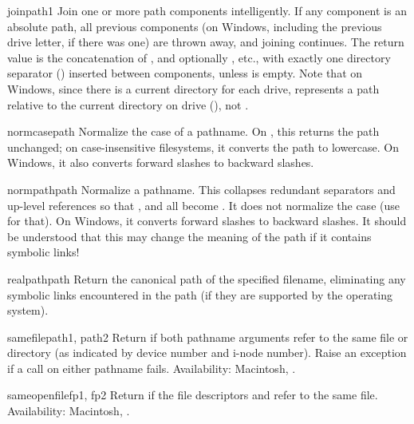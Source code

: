 \begin{funcdesc}{join}{path1}
Join one or more path components intelligently.  If any component is
an absolute path, all previous components (on Windows, including the
previous drive letter, if there was one) are thrown away, and joining
continues.  The return value is the concatenation of , and
optionally , etc., with exactly one directory separator
() inserted between components, unless  is
empty.  Note that on Windows, since there is a current directory for
each drive,  represents a path
relative to the current directory on drive  (), not
.
\end{funcdesc}

\begin{funcdesc}{normcase}{path}
Normalize the case of a pathname.  On \UNIX, this returns the path
unchanged; on case-insensitive filesystems, it converts the path to
lowercase.  On Windows, it also converts forward slashes to backward
slashes.
\end{funcdesc}

\begin{funcdesc}{normpath}{path}
Normalize a pathname.  This collapses redundant separators and
up-level references so that ,  and
 all become .  It does not normalize the
case (use  for that).  On Windows, it converts
forward slashes to backward slashes. It should be understood that this may
change the meaning of the path if it contains symbolic links! 
\end{funcdesc}

\begin{funcdesc}{realpath}{path}
Return the canonical path of the specified filename, eliminating any
symbolic links encountered in the path (if they are supported by the
operating system).
\end{funcdesc}

\begin{funcdesc}{samefile}{path1, path2}
Return  if both pathname arguments refer to the same file or
directory (as indicated by device number and i-node number).
Raise an exception if a  call on either pathname
fails.
Availability:  Macintosh, \UNIX.
\end{funcdesc}

\begin{funcdesc}{sameopenfile}{fp1, fp2}
Return  if the file descriptors  and  refer
to the same file.
Availability:  Macintosh, \UNIX.
\end{funcdesc}

